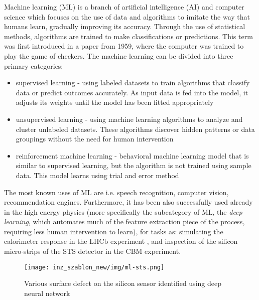 \pagestyle{fancy}
Machine learning (ML) is a branch of artificial intelligence (AI) and computer science which focuses on the use of data and algorithms to imitate the way that humans learn, gradually improving its accuracy. Through the use of statistical methods, algorithms are trained to make classifications or predictions\cite{ibm}. This term was first introduced in a paper from 1959, where the computer was trained to play the game of checkers\cite{ml0}. The machine learning can be divided into three primary categories:
\begin{itemize}\thispagestyle{fancy}
    \item supervised learning - using labeled datasets to train algorithms that classify data or predict outcomes accurately. As input data is fed into the model, it adjusts its weights until the model has been fitted appropriately
    \item unsupervised learning - using machine learning algorithms to analyze and cluster unlabeled datasets. These algorithms discover hidden patterns or data groupings without the need for human intervention
    \item reinforcement machine learning -  behavioral machine learning model that is similar to supervised learning, but the algorithm is not trained using sample data. This model learns using trial and error method\cite{ibm}
    \end{itemize}
The most known uses of ML are i.e. speech recognition, computer vision, recommendation engines. Furthermore, it has been also successfully used already in the high energy physics (more specifically the subcategory of ML, the \emph{deep learning}, which automates much of the feature extraction piece of the process, requiring less human intervention to learn), for tasks as: simulating the calorimeter response in the LHCb experiment \cite{lhcb}, and inspection of the silicon micro-strips of the STS detector in the CBM experiment\cite{zenia}.
\begin{figure}[H]
    \centering
    \texttt{[image: inz\_szablon\_new/img/ml-sts.png]}
    \caption{Various surface defect on the silicon sensor identified using deep neural network\cite{zenia}}
    \label{zenia ml}
\end{figure}


